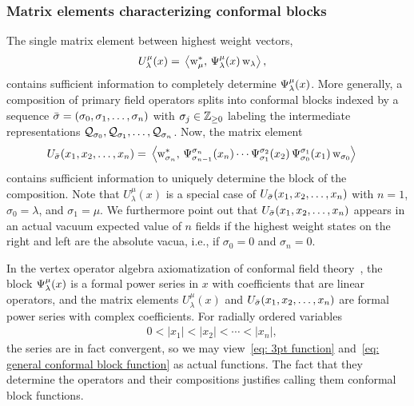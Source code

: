 \documentclass[oneside,english]{amsart}
\numberwithin{equation}{section}
\numberwithin{figure}{section}
\theoremstyle{plain}
\theoremstyle{plain}
\theoremstyle{plain}
\theoremstyle{remark}
\theoremstyle{plain}
\theoremstyle{plain}
\theoremstyle{plain}
\theoremstyle{plain}
\theoremstyle{plain}
\theoremstyle{plain}
\theoremstyle{plain}
\theoremstyle{plain}
\newcommand{\red}[1]{{\color{red} #1}}
\begin{document}
\subsubsection{\textbf{Matrix elements characterizing conformal blocks}}

The single matrix element between highest weight vectors,
\begin{align} \label{eq: 3pt function}
U_{\lambda}^{\mu}(x)=\; & \left\langle  \mathrm{w}_{\mu}^{*} , \, \Psi_{\lambda}^{\mu}(x)\,\mathrm{w}_{\lambda}  \right\rangle, 
\end{align}
contains sufficient information to completely
determine $\Psi_{\lambda}^{\mu}(x)$.
More generally, a composition of primary field operators
splits into conformal blocks indexed by a sequence $\bar{\sigma}=(\sigma_{0},\sigma_{1},\ldots,\sigma_{n})$
with $\sigma_{j}\in\mathbb{Z}_{\geq 0}$ %
labeling the intermediate
representations $\mathcal{Q}_{\sigma_{0}},\mathcal{Q}_{\sigma_{1}},\ldots,\mathcal{Q}_{\sigma_{n}}$.
Now, the matrix element 
\begin{align}
U_{\bar{\sigma}}(x_{1},x_{2},\ldots,x_{n})=\; & \left\langle  \mathrm{w}_{\sigma_{n}}^{*} , \, \Psi_{\sigma_{n-1}}^{\sigma_{n}}(x_{n})\cdots\Psi_{\sigma_{1}}^{\sigma_{2}}(x_{2})\,\Psi_{\sigma_{0}}^{\sigma_{1}}(x_{1})\,\mathrm{w}_{\sigma_{0}}  \right\rangle\label{eq: general conformal block function}
\end{align}
contains sufficient information to uniquely
determine the block of the composition.
Note that $U_{\lambda}^{\mu}(x)$ is a special case of $U_{\bar{\sigma}}(x_{1},x_{2},\ldots,x_{n})$
with $n=1$, $\sigma_{0}=\lambda$, and $\sigma_{1}=\mu$. 
We furthermore point out that $U_{\bar{\sigma}}(x_{1},x_{2},\ldots,x_{n})$ appears
in an actual vacuum expected value of $n$ fields if the highest weight
states on the right and left are the absolute vacua, i.e., if $\sigma_{0}=0$ and $\sigma_{n}=0$.

In the vertex operator algebra axiomatization of conformal field theory~\cite{Lepowsky_Li-VOA},
the block
$\Psi_{\lambda}^{\mu}(x)$ is a formal power
series in $x$ with
coefficients that are linear operators, and 
the matrix elements
$U_{\lambda}^{\mu}(x)$ and $U_{\bar{\sigma}}(x_{1},x_{2},\ldots,x_{n})$ are formal power series with complex coefficients. For radially ordered variables
\begin{align*}
 & 0<|x_{1}|<|x_{2}|<\cdots<|x_{n}|,
\end{align*}
the series are in fact convergent, so we may
view~\eqref{eq: 3pt function} and~\eqref{eq: general conformal block function}
as actual functions.
The fact that they determine the operators and their compositions
justifies calling them conformal block functions.
\end{document}
